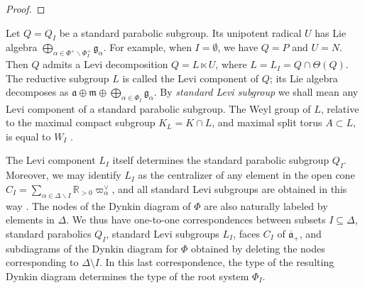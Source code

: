 \documentclass[12pt]{amsart}
\theoremstyle{remark}
\begin{document}
\begin{proof}
\end{proof}

Let $Q=Q_I$ be a standard parabolic subgroup. Its unipotent radical $U$ has Lie algebra $\bigoplus_{\alpha \in \Phi^+\smallsetminus \Phi_I^+} \mathfrak{g}_{\alpha}$. For example, when $I=\emptyset$, we have $Q=P$ and $U=N$. Then $Q$ admits a Levi decomposition $Q = L \ltimes U$, where $L=L_I=Q \cap \Theta(Q)$. The reductive subgroup $L$ is called the Levi component of $Q$; its Lie algebra decomposes as $\mathfrak{a} \oplus\mathfrak{m}\oplus \bigoplus_{\alpha \in \Phi_I} \mathfrak{g}_{\alpha}$. By \textit{standard Levi subgroup} we shall mean any Levi component of a standard parabolic subgroup. The Weyl group of $L$, relative to the maximal compact subgroup $K_L = K \cap L$, and maximal split torus $A\subset L$, is equal to $W_I$ \cite[\S 27.1, Theorem]{Humphreys}.

The Levi component $L_I$ itself determines the standard parabolic subgroup $Q_I$. Moreover, we may identify $L_I$ as the centralizer of any element in the open cone $C_I=\sum_{\alpha \in \Delta \smallsetminus I} \mathbb{R}_{> 0} \varpi^\vee_\alpha$, and all standard Levi subgroups are obtained in this way \cite[\S 30.2]{Humphreys}. The nodes of the Dynkin diagram of $\Phi$ are also naturally labeled by elements in $\Delta$. We thus have one-to-one correspondences between subsets $I\subseteq\Delta$, standard parabolics $Q_I$, standard Levi subgroups $L_I$, faces $C_I$ of $\overline{\mathfrak{a}}_+$, and subdiagrams of the Dynkin diagram for $\Phi$ obtained by deleting the nodes corresponding to $\Delta \setminus I$. In this last correspondence, the type of the resulting Dynkin diagram determines the type of the root system $\Phi_I$.
\end{document}
